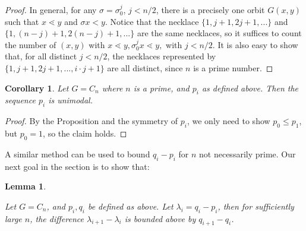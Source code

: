 \documentclass[10 pt]{amsart}
\theoremstyle{plain}
\newtheorem{lem}[thm]{Lemma}
\newtheorem{cor}[thm]{Corollary}
\theoremstyle{definition}
\theoremstyle{remark}
\numberwithin{equation}{section}
\begin{document}
\begin{proof}

  
In general, for any $\sigma = \sigma_0^{j}$, $j < n/2$, there is a precisely one orbit $G(x,y)$ such that $x \lessdot y$ and $\sigma x < y$.  Notice that the necklace $\{1, j+1,2j+1, ...  \}$ and $\{1, (n-j)+1, 2(n-j)+1, ... \}$ are the same necklaces, so it suffices to count the number of $(x, y)$ with $x \lessdot y,\sigma_0^jx \lessdot y,$ with $j < n/2$. It is also easy to show that, for all distinct $j < n/2$, the necklaces represented by $\{1, j+1, 2j+1, ..., i\cdot j+1\}$ are all distinct, since $n$ is a prime number. 
\end{proof}

\begin{cor}{\label{cor:cyclic_prime_unimodal}} Let $G = C_n$ where $n$ is a prime, and $p_i$ as defined above. Then the sequence $p_i$ is unimodal. 
\end{cor}

\begin{proof}
By the Proposition and the symmetry of $p_i$, we only need to show $p_0 \le p_1$, but $p_0 = 1$, so the claim holds.
\end{proof}

A similar method can be used to bound $q_i - p_i$ for $n$ not necessarily prime.  Our next goal in the section is to show that:

\begin{lem}{\label{lem:cyclicgeneral}}

Let $G = C_n$, and $p_i, q_i$ be defined as above. Let $\lambda_i = q_i - p_i$, then for sufficiently large $n$, the difference $\lambda_{i+1} - \lambda_{i}$ is bounded above by  $q_{i+1} - q_i$. \end{lem}
\end{document}
